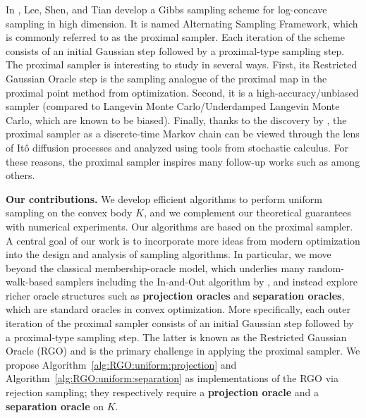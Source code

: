 \documentclass[11pt,letterpaper]{article}
\begin{document}
In \cite{leestructured21}, Lee, Shen, and Tian develop a Gibbs sampling scheme for log-concave sampling in high dimension. It is named Alternating Sampling Framework, which is commonly referred to as the proximal sampler. Each iteration of the scheme consists of an initial Gaussian step followed by a proximal-type sampling step. The proximal sampler is interesting to study in several ways. First, its Restricted Gaussian Oracle step is the sampling analogue of the proximal map in the proximal point method from optimization. Second, it is a high-accuracy/unbiased sampler (compared to Langevin Monte Carlo/Underdamped Langevin Monte Carlo, which are known to be biased). Finally, thanks to the discovery by \cite{chen2022improved}, the proximal sampler as a discrete-time Markov chain can be viewed through the lens of It\^{o} diffusion processes and analyzed using tools from stochastic calculus. For these reasons, the proximal sampler inspires many follow-up works such as \cite{gopi22a,chen2025rapid,pmlr-v272-mitra25a,wibisono2025mixing,yuan2023class,yuan2025proximal,liangchen2022proximal,fan2023improved,liang2023a} among others. 




\textbf{Our contributions.} We develop efficient algorithms to perform uniform sampling on the convex body $K$, and we complement our theoretical guarantees with numerical experiments. Our algorithms are based on the proximal sampler. A central goal of our work is to incorporate more ideas from modern optimization into the design and analysis of sampling algorithms. In particular, we move beyond the classical membership-oracle model, which underlies many random-walk-based samplers including the In-and-Out algorithm by \cite{kook2024inandout}, and instead explore richer oracle structures such as \textbf{projection oracles} and \textbf{separation oracles}, which are standard oracles in convex optimization. More specifically, each outer iteration of the proximal sampler consists of an initial Gaussian step followed by a proximal-type sampling step. The latter is known as the Restricted Gaussian Oracle (RGO) and is the primary challenge in applying the proximal sampler. We propose Algorithm~\ref{alg:RGO:uniform:projection} and Algorithm~\ref{alg:RGO:uniform:separation} as implementations of the RGO via rejection sampling; they respectively require a \textbf{projection oracle} and a \textbf{separation oracle} on $K$. 
\end{document}
